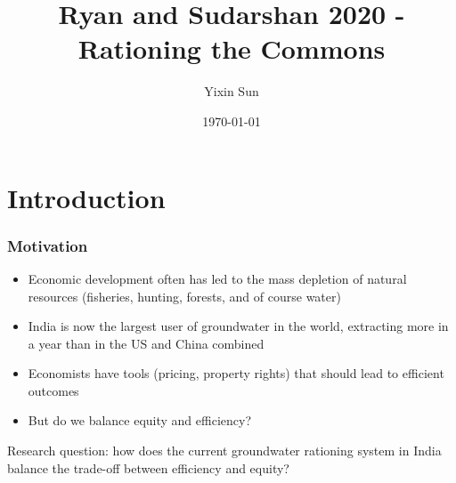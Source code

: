 \documentclass[aspectratio=169]{beamer}
\title{Ryan and Sudarshan 2020 - Rationing the Commons}
\author{Yixin Sun}
\institute{\emph{EEE Presentation}}
\date{\today}
\begin{document}
\begin{frame}
\titlepage
\end{frame}


\section{Introduction}
\begin{frame}
    \frametitle{Motivation}
    \begin{itemize}
        \item Economic development often has led to the mass depletion of natural resources (fisheries, hunting, forests, and of course water) \pause 
        \item India is now the largest user of groundwater in the world, extracting more in a year than in the US and China combined \pause 
        \item Economists have tools (pricing, property rights) that should lead to efficient outcomes \pause
        \item But do we balance equity and efficiency? \pause 
    \end{itemize}

    Research question: how does the current groundwater rationing system in India balance the trade-off between efficiency and equity?
\end{frame}
\end{document}
